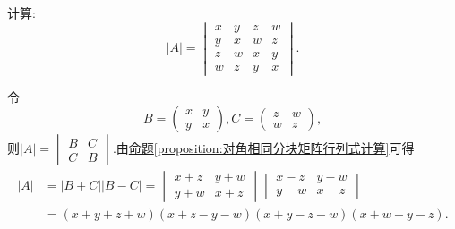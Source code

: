 \documentclass[../../main.tex]{subfiles}%
\begin{document}
\begin{example}
计算:
\[
|A| = 
\begin{vmatrix}
x & y & z & w\\
y & x & w & z\\
z & w & x & y\\
w & z & y & x
\end{vmatrix}.
\]
\end{example}
\begin{solution}

令
\[
B = 
\begin{pmatrix}
x & y\\
y & x
\end{pmatrix},
C = 
\begin{pmatrix}
z & w\\
w & z
\end{pmatrix},
\]
则\(|A| = 
\begin{vmatrix}
B & C\\
C & B
\end{vmatrix}\).由\hyperref[proposition:对角相同分块矩阵行列式计算]{命题\ref{proposition:对角相同分块矩阵行列式计算}}可得
\begin{align*}
|A|&=|B + C||B - C|
=\begin{vmatrix}
x + z & y + w\\
y + w & x + z
\end{vmatrix}\begin{vmatrix}
x - z & y - w\\
y - w & x - z
\end{vmatrix}\\
&=(x + y + z + w)(x + z - y - w)(x + y - z - w)(x + w - y - z).
\end{align*}

\end{solution}
\end{document}

